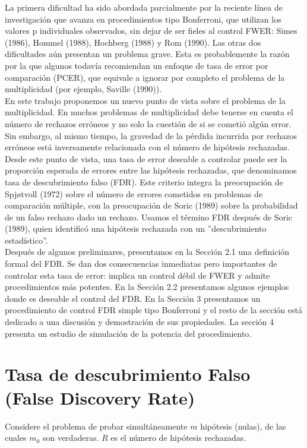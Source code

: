 \documentclass[11pt,letterpaper]{article}
\begin{document}
La primera dificultad ha sido abordada parcialmente por la reciente línea de investigación que avanza en procedimientos tipo Bonferroni, que utilizan los valores p individuales observados, sin dejar de ser fieles al control FWER: Simes (1986), Hommel (1988), Hochberg (1988) y Rom (1990). Las otras dos dificultades aún presentan un problema grave. Esta es probablemente la razón por la que algunos todavía recomiendan un enfoque de tasa de error por comparación (PCER), que equivale a ignorar por completo el problema de la multiplicidad (por ejemplo, Saville (1990)).\\
En este trabajo proponemos un nuevo punto de vista sobre el problema de la multiplicidad. En muchos problemas de multiplicidad debe tenerse en cuenta el número de rechazos erróneos y no solo la cuestión de si se cometió algún error. Sin embargo, al mismo tiempo, la gravedad de la pérdida incurrida por rechazos erróneos está inversamente relacionada con el número de hipótesis rechazadas. Desde este punto de vista, una tasa de error deseable a controlar puede ser la proporción esperada de errores entre las hipótesis rechazadas, que denominamos tasa de descubrimiento falso (FDR). Este criterio integra la preocupación de Spjøtvoll (1972) sobre el número de errores cometidos en problemas de comparación múltiple, con la preocupación de Soric (1989) sobre la probabilidad de un falso rechazo dado un rechazo. Usamos el término FDR después de Soric (1989), quien identificó una hipótesis rechazada con un ''descubrimiento estadístico''.\\
Después de algunos preliminares, presentamos en la Sección 2.1 una definición formal del FDR. Se dan dos consecuencias inmediatas pero importantes de controlar esta tasa de error: implica un control débil de FWER y admite procedimientos más potentes. En la Sección 2.2 presentamos algunos ejemplos donde es deseable el control del FDR. En la Sección 3 presentamos un procedimiento de control FDR simple tipo Bonferroni y el resto de la sección está dedicado a una discusión y demostración de sus propiedades. La sección 4 presenta un estudio de simulación de la potencia del procedimiento.

\section{Tasa de descubrimiento Falso (False Discovery Rate)}
Considere el problema de probar simultáneamente $m$ hipótesis (nulas), de las cuales $m_0$ son verdaderas. $R$ es el número de hipótesis rechazadas.
\end{document}
